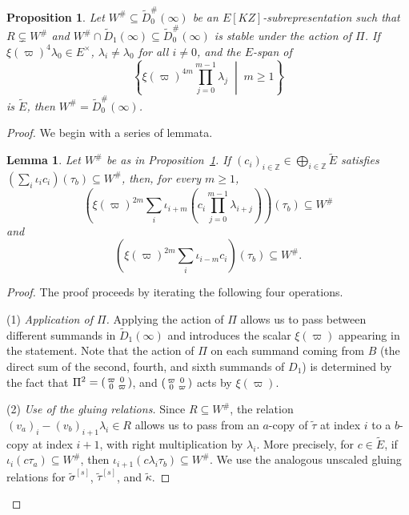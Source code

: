 \documentclass[a4paper,10pt,twoside]{amsart}
\newtheorem{proposition}[theorem]{Proposition}
\newtheorem{lemma}[theorem]{Lemma}
\theoremstyle{definition}
\numberwithin{equation}{section}
\begin{document}
\begin{proposition}\label{irred prop}
Let $W^\# \subseteq \widetilde{D}_0^\#(\infty)$ be an $E[KZ]$-subrepresentation such that $R \subsetneq W^\#$ and $W^\# \cap \widetilde{D}_1(\infty)\subseteq \widetilde{D}_0^\#(\infty)$ is stable under the action of $\Pi$. If $\xi(\varpi)^4 \lambda_0 \in E^{\times}$, $\lambda_i \neq \lambda_0$ for all $i \neq 0$, and the $E$-span of
\[
\left\{
\xi(\varpi)^{4m}
\prod_{j=0}^{m-1} \lambda_{j}
\;\middle|\;
m \ge 1
\right\}
\]
is $\widetilde{E}$, then $W^\# = \widetilde{D}_0^\#(\infty)$.
\end{proposition}
\begin{proof}
    We begin with a series of lemmata.

\begin{lemma}\label{propagation lemma}
Let \(W^\#\) be as in Proposition~\ref{irred prop}. If \((c_i)_{i\in\mathbb Z}\in \bigoplus_{i\in\mathbb Z}\widetilde E\) satisfies \(\left(\sum_i\iota_i c_i\right)(\tau_b)\subseteq W^\#\), then, for every \(m\geq1\),
\[
\left(
\xi(\varpi)^{2m}
\sum_i
\iota_{i+m}
\left(
c_i\prod_{j=0}^{m-1}\lambda_{i+j}
\right)
\right)(\tau_b)
\subseteq W^\#
\]
and
\[
\left(
\xi(\varpi)^{2m}
\sum_i\iota_{i-m}c_i
\right)(\tau_b)
\subseteq W^\#.
\]
\end{lemma}




\begin{proof}
The proof proceeds by iterating the following four operations.

\medskip

\noindent
(1) \emph{Application of $\Pi$.} 
Applying the action of $\Pi$ allows us to pass between different summands in $\widetilde{D}_1(\infty)$ and introduces the scalar $\xi(\varpi)$ appearing in the statement. Note that the action of $\Pi$ on each summand coming from $B$ (the direct sum of the second,
fourth, and sixth summands of \(D_1\)) is determined by the fact that $\Pi^2 = \begin{psmallmatrix}
\varpi&0\\
0&\varpi
\end{psmallmatrix}$, and $\begin{psmallmatrix}
\varpi&0\\
0&\varpi
\end{psmallmatrix}$ acts by $\xi(\varpi)$.

\medskip

\noindent
(2) \emph{Use of the gluing relations.}
Since \(R\subseteq W^\#\), the relation $(v_a)_i-(v_b)_{i+1}\lambda_i
\in
R
$ allows us to pass from an \(a\)-copy of \(\widetilde\tau\) at index
\(i\) to a \(b\)-copy at index \(i+1\), with right multiplication
by \(\lambda_i\). More precisely, for \(c\in\widetilde E\), if \(
\iota_i(c\tau_a)\subseteq W^\#\), then \(\iota_{i+1}(c\lambda_i\tau_b)\subseteq W^\#.
\) We use the analogous unscaled gluing relations for
\(\widetilde\sigma^{[s]}\), \(\widetilde\tau^{[s]}\), and
\(\widetilde\kappa\).


\end{proof}
\end{proof}
\end{document}
